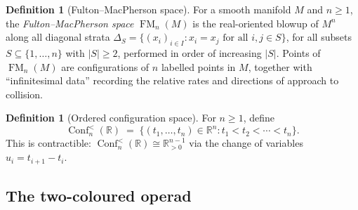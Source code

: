 \documentclass[11pt,reqno]{amsart}
\theoremstyle{definition}
\newtheorem{definition}[theorem]{Definition}
\theoremstyle{remark}
\newcommand{\RR}{\mathbb{R}}
\DeclareMathOperator{\Conf}{Conf}
\DeclareMathOperator{\FM}{FM}
\numberwithin{equation}{section}
\begin{document}
\begin{definition}[Fulton--MacPherson space]
\label{def:FM-space}
For a smooth manifold $M$ and $n \geq 1$, the
\emph{Fulton--MacPherson space} $\FM_n(M)$ is the real-oriented
blowup of $M^n$ along all diagonal strata
$\Delta_S = \{(x_i)_{i \in I} : x_i = x_j \text{ for all }
i,j \in S\}$, for all subsets $S \subseteq \{1,\ldots,n\}$ with
$|S| \geq 2$, performed in order of increasing $|S|$.  Points
of $\FM_n(M)$ are configurations of $n$ labelled points in $M$,
together with ``infinitesimal data'' recording the relative rates
and directions of approach to collision.
\end{definition}

\begin{definition}[Ordered configuration space]
\label{def:ordered-conf}
For $n \geq 1$, define
\[
  \Conf_n^{<}(\RR)
  \;=\;
  \{(t_1, \ldots, t_n) \in \RR^n : t_1 < t_2 < \cdots < t_n\}.
\]
This is contractible: $\Conf_n^{<}(\RR) \cong \RR^{n-1}_{>0}$
via the change of variables $u_i = t_{i+1} - t_i$.
\end{definition}

\subsection{The two-coloured operad}
\end{document}
